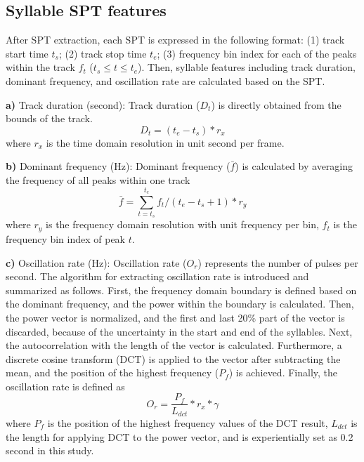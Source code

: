 \subsection{Syllable SPT features}

After SPT extraction, each SPT is expressed in the following format: (1) track start time $t_{s}$; (2) track stop time $t_{e}$; (3) frequency bin index for each of the peaks within the track $f_{t}$ ($t_{s} \leq t \leq t_{e}$).  Then, syllable features including track duration, dominant frequency, and oscillation rate are calculated based on the SPT.

\noindent \textbf{a)} Track duration (second):
Track duration ($D_{t}$) is directly obtained from the bounds of the track.
\begin{equation}
D_{t} = (t_{e}-t_{s})*r_{x}
\end{equation}
\noindent where $r_{x}$ is the time domain resolution in unit second per frame.

\noindent \textbf{b)} Dominant frequency (Hz): 
Dominant frequency ($\bar{f}$) is calculated by averaging the frequency of all peaks within one track
\begin{equation}
\bar{f} = \sum_{t=t_{s}}^{t_{e}}f_{t}/(t_{e}-t_{s}+1)*r_{y}
\end{equation}
where $r_{y}$ is the frequency domain resolution with unit frequency per bin, $f_{t}$ is the frequency bin index of peak $t$.

\noindent  \textbf{c)} Oscillation rate (Hz):  
Oscillation rate ($O_{r}$) represents the number of pulses per second. The algorithm for extracting oscillation rate is introduced and summarized as follows.
First, the frequency domain boundary is defined based on the dominant frequency, and the power within the boundary is calculated. Then, the power vector is normalized, and the first and last 20\% part of the vector is discarded, because of the uncertainty in the start and end of the syllables. Next, the autocorrelation with the length of the vector is calculated. Furthermore, a discrete cosine transform (DCT) is applied to the vector after subtracting the mean, and the position of the highest frequency ($P_{f}$) is achieved. Finally, the oscillation rate is defined as
\begin{equation}
O_{r}= \frac{P_{f}}{L_{dct}}*r_{x}*\gamma
\end{equation}
\noindent where $P_{f}$ is the position of the highest frequency values of the DCT result, $L_{dct}$ is the length for applying DCT to the power vector, and is experientially set as 0.2 second in this study. 



